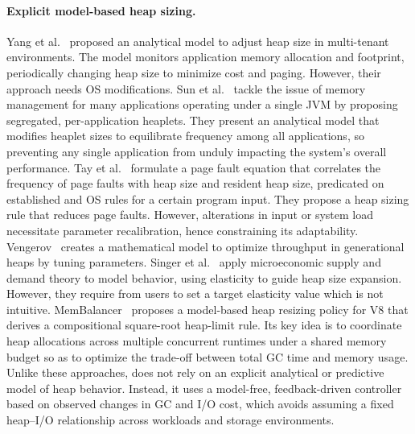 \paragraph{\textbf{Explicit model-based heap sizing.}}
Yang et al.~\cite{yang:real_mem} proposed an analytical model to adjust heap size in multi-tenant environments.
The model monitors application memory allocation and footprint, periodically changing heap size to minimize \flexheapGC{} cost and paging.
However, their approach needs OS modifications.
%
Sun et al.~\cite{sun:multi_space_heap} tackle the issue of memory management for many applications operating under a single JVM by proposing segregated, per-application heaplets.
They present an analytical model that modifies heaplet sizes to equilibrate \flexheapGC{} frequency among all applications, so preventing any single application from unduly impacting the system's overall performance.
%
Tay et al.~\cite{tay:page_fault} formulate a page fault equation that correlates the frequency of page faults with heap size and resident heap size, predicated on established \flexheapGC{} and OS rules for a certain program input.
They propose a heap sizing rule that reduces page faults.
However, alterations in input or system load necessitate parameter recalibration, hence constraining its adaptability.
%
Vengerov~\cite{vengerov:gc_analysis} creates a mathematical model to optimize throughput in generational heaps by tuning \flexheapGC{} parameters.
%
Singer et al.~\cite{singer:economics} apply microeconomic supply and demand theory to model \flexheapGC{} behavior, using elasticity to guide heap size expansion.
However, they require from users to set a target elasticity value which is not intuitive.
%
MemBalancer~\cite{kirisame:membalancer} proposes a model-based heap resizing policy for V8 that derives a compositional square-root heap-limit rule.
Its key idea is to coordinate heap allocations across multiple concurrent runtimes under a shared memory budget so as to optimize the trade-off between total GC time and memory usage.
%
Unlike these approaches, \flexheapName{} does not rely on an explicit analytical or predictive model of heap behavior.
Instead, it uses a model-free, feedback-driven controller based on observed changes in GC and I/O cost, which avoids assuming a fixed heap--I/O relationship across workloads and storage environments.

